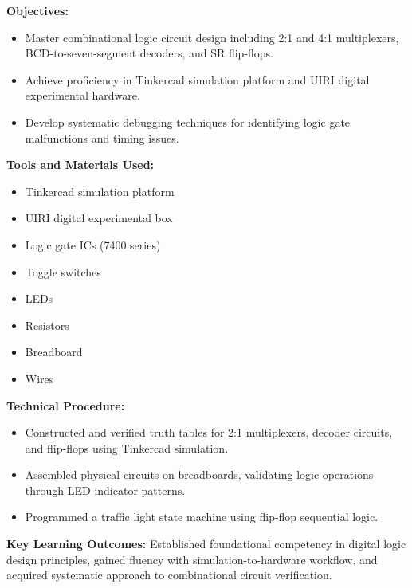 \documentclass[12pt,a4paper]{report}
\begin{document}
\noindent\textbf{Objectives:}
\begin{itemize}
    \item Master combinational logic circuit design including 2:1 and 4:1 multiplexers, BCD-to-seven-segment decoders, and SR flip-flops.
    \item Achieve proficiency in Tinkercad simulation platform and UIRI digital experimental hardware.
    \item Develop systematic debugging techniques for identifying logic gate malfunctions and timing issues.
\end{itemize}

\newpage
\noindent\textbf{Tools and Materials Used:}
\begin{multicols}{2}
\begin{itemize}
    \item Tinkercad simulation platform
    \item UIRI digital experimental box
    \item Logic gate ICs (7400 series)
    \item Toggle switches
    \item LEDs
    \item Resistors
    \item Breadboard
    \item Wires
\end{itemize}
\end{multicols}

\noindent\textbf{Technical Procedure:}
\begin{itemize}
    \item Constructed and verified truth tables for 2:1 multiplexers, decoder circuits, and flip-flops using Tinkercad simulation.
    \item Assembled physical circuits on breadboards, validating logic operations through LED indicator patterns.
    \item Programmed a traffic light state machine using flip-flop sequential logic.
\end{itemize}

\noindent\textbf{Key Learning Outcomes:} Established foundational competency in digital logic design principles, gained fluency with simulation-to-hardware workflow, and acquired systematic approach to combinational circuit verification.
\end{document}
